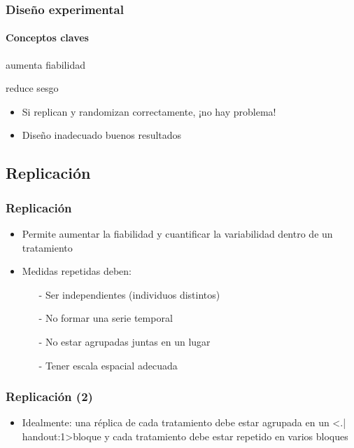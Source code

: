 \documentclass[mathserif]{beamer}
\begin{document}
\begin{frame}[label=expdes1]
   \frametitle{Diseño experimental}
   \framesubtitle{Conceptos claves}
   \begin{description}[<+-| handout:1>]
      \item[Replicaci\'on:] aumenta fiabilidad
      \item[Aleatorizaci\'on:] reduce sesgo
   \end{description}
   \medskip
   \begin{itemize}[<+-| handout:1>]
      \item Si replican y randomizan correctamente, ¡no hay problema! \\
      \item Diseño inadecuado \raisebox{-0.8ex}{} buenos resultados
   \end{itemize}
\end{frame}%


\subsection[Replicaci\'on]{Replicaci\'on}

\begin{frame}[label=replic1]
\frametitle{Replicaci\'on}
   \begin{itemize}[<+-| handout:1>]
      \item Permite aumentar la fiabilidad y cuantificar la variabilidad dentro de un tratamiento
      \medskip
      \item Medidas repetidas deben:
         \begin{itemize}[<+- | alert@+| handout:1>]
            \item[-] Ser independientes (individuos distintos)
            \item[-] No formar una serie temporal 
            \item[-] No estar agrupadas juntas en un lugar
            \item[-] Tener escala espacial adecuada
         \end{itemize}
   \end{itemize}
\end{frame}%


\begin{frame}[label=replic2]
   \frametitle{Replicaci\'on (2)}
   \begin{itemize}[<+-| handout:1>]
      \item Idealmente: una r\'eplica de cada tratamiento debe estar agrupada en un \structure<.| handout:1>{bloque} y cada tratamiento debe estar repetido en varios bloques 
   \end{itemize}
\end{frame}%
\end{document}
